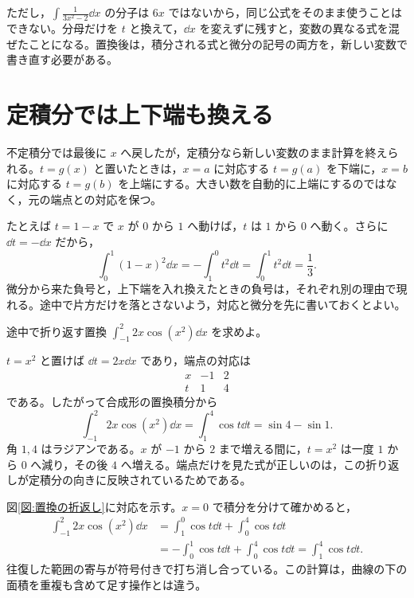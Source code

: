 ただし，$\int\frac1{3x^2-2}\dd x$ の分子は $6x$ ではないから，同じ公式をそのまま使うことはできない。分母だけを $t$ と換えて，$\dd x$ を変えずに残すと，変数の異なる式を混ぜたことになる。置換後は，積分される式と微分の記号の両方を，新しい変数で書き直す必要がある。

\section{定積分では上下端も換える}\label{節:置換と積分区間}

不定積分では最後に $x$ へ戻したが，定積分なら新しい変数のまま計算を終えられる。$t=g(x)$ と置いたときは，$x=a$ に対応する $t=g(a)$ を下端に，$x=b$ に対応する $t=g(b)$ を上端にする。大きい数を自動的に上端にするのではなく，元の端点との対応を保つ。

たとえば $t=1-x$ で $x$ が $0$ から $1$ へ動けば，$t$ は $1$ から $0$ へ動く。さらに $\dd t=-\dd x$ だから，
\[
 \int_0^1(1-x)^2\dd x
 =-\int_1^0 t^2\dd t
 =\int_0^1t^2\dd t=\frac13.
\]
微分から来た負号と，上下端を入れ換えたときの負号は，それぞれ別の理由で現れる。途中で片方だけを落とさないよう，対応と微分を先に書いておくとよい。

\begin{example}{途中で折り返す置換}
$\int_{-1}^{2}2x\cos(x^2)\dd x$ を求めよ。
\end{example}

$t=x^2$ と置けば $\dd t=2x\dd x$ であり，端点の対応は
\[
 \begin{array}{c|cc}
 x&-1&2\\ \hline
 t&1&4
 \end{array}
\]
である。したがって合成形の置換積分から
\[
 \int_{-1}^{2}2x\cos(x^2)\dd x
 =\int_1^4\cos t\dd t
 =\sin4-\sin1.
\]
角 $1,4$ はラジアンである。$x$ が $-1$ から $2$ まで増える間に，$t=x^2$ は一度 $1$ から $0$ へ減り，その後 $4$ へ増える。端点だけを見た式が正しいのは，この折り返しが定積分の向きに反映されているためである。

図\ref{図:置換の折返し}に対応を示す。$x=0$ で積分を分けて確かめると，
\[
\begin{aligned}
 \int_{-1}^{2}2x\cos(x^2)\dd x
 &=\int_1^0\cos t\dd t+\int_0^4\cos t\dd t\\
 &=-\int_0^1\cos t\dd t+\int_0^4\cos t\dd t
 =\int_1^4\cos t\dd t.
\end{aligned}
\]
往復した範囲の寄与が符号付きで打ち消し合っている。この計算は，曲線の下の面積を重複も含めて足す操作とは違う。

